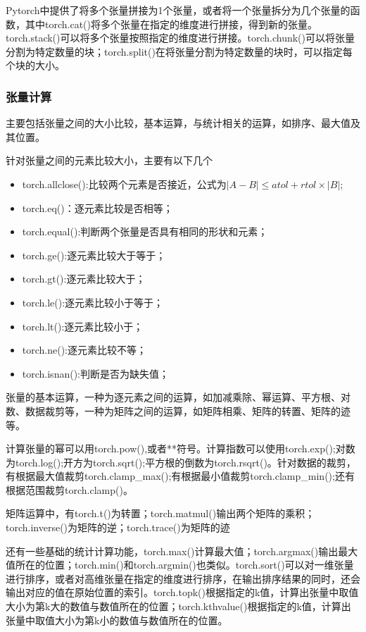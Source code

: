 \documentclass[cn,hazy,blue,14pt,screen]{elegantnote}
\begin{document}
Pytorch中提供了将多个张量拼接为1个张量，或者将一个张量拆分为几个张量的函数，其中torch.cat()将多个张量在指定的维度进行拼接，得到新的张量。torch.stack()可以将多个张量按照指定的维度进行拼接。torch.chunk()可以将张量分割为特定数量的块；torch.split()在将张量分割为特定数量的块时，可以指定每个块的大小。

\subsubsection{张量计算}

主要包括张量之间的大小比较，基本运算，与统计相关的运算，如排序、最大值及其位置。

针对张量之间的元素比较大小，主要有以下几个
\begin{itemize}
  \item torch.allclose():比较两个元素是否接近，公式为$|A-B|\le atol+rtol \times |B|$;
  \item torch.eq()：逐元素比较是否相等；
  \item torch.equal():判断两个张量是否具有相同的形状和元素；
  \item torch.ge():逐元素比较大于等于；
  \item torch.gt():逐元素比较大于；
  \item torch.le():逐元素比较小于等于；
  \item torch.lt():逐元素比较小于；
  \item torch.ne():逐元素比较不等；
  \item torch.isnan():判断是否为缺失值；
\end{itemize}

张量的基本运算，一种为逐元素之间的运算，如加减乘除、幂运算、平方根、对数、数据裁剪等，一种为矩阵之间的运算，如矩阵相乘、矩阵的转置、矩阵的迹等。

计算张量的幂可以用torch.pow(),或者**符号。计算指数可以使用torch.exp();对数为torch.log();开方为torch.sqrt();平方根的倒数为torch.rsqrt()。针对数据的裁剪，有根据最大值裁剪torch.clamp\_max();有根据最小值裁剪torch.clamp\_min();还有根据范围裁剪torch.clamp()。

矩阵运算中，有torch.t()为转置；torch.matmul()输出两个矩阵的乘积；torch.inverse()为矩阵的逆；torch.trace()为矩阵的迹

还有一些基础的统计计算功能，torch.max()计算最大值；torch.argmax()输出最大值所在的位置；torch.min()和torch.argmin()也类似。torch.sort()可以对一维张量进行排序，或者对高维张量在指定的维度进行排序，在输出排序结果的同时，还会输出对应的值在原始位置的索引。torch.topk()根据指定的k值，计算出张量中取值大小为第k大的数值与数值所在的位置；torch.kthvalue()根据指定的k值，计算出张量中取值大小为第k小的数值与数值所在的位置。
\end{document}
